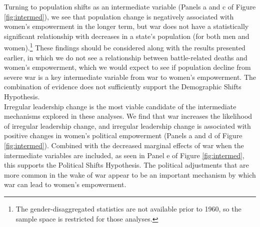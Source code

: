 \documentclass [12pt] {article}
\begin{document}
Turning to population shifts as an intermediate variable (Panels a and c of Figure \ref{fig:intermed}), we see that population change is negatively associated with women's empowerment in the longer term, but war does not have a statistically significant relationship with decreases in a state's population (for both men and women).\footnote{The gender-disaggregated statistics are not available prior to 1960, so the sample space is restricted for those analyses.} These findings should be considered along with the results presented earlier, in which we do not see a relationship between battle-related deaths and women's empowerment, which we would expect to see if population decline from severe war is a key intermediate variable from war to women's empowerment. The combination of evidence does not sufficiently support the Demographic Shifts Hypothesis.\\

Irregular leadership change is the most viable candidate of the intermediate mechanisms explored in these analyses. We find that war increases the likelihood of irregular leadership change, and irregular leadership change is associated with positive changes in women's political empowerment (Panels a and d of Figure \ref{fig:intermed}). Combined with the decreased marginal effects of war when the intermediate variables are included, as seen in Panel e of Figure \ref{fig:intermed}, this supports the Political Shifts Hypothesis. The political adjustments that are more common in the wake of war appear to be an important mechanism by which war can lead to women's empowerment. \\
\end{document}
